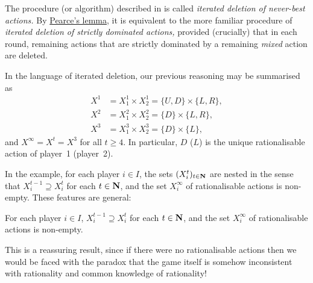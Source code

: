 The procedure (or algorithm) described in  is called \emph{iterated deletion of never-best actions.} By \hyperref[lemma:pearce]{Pearce's lemma}, it is equivalent to the more familiar procedure of \emph{iterated deletion of strictly dominated actions,} provided (crucially) that in each round, remaining actions that are strictly dominated by a remaining \emph{mixed} action are deleted.

\addtocounter{example}{-2}
\begin{example}[continued]
	\label{example:rbty_neverbest_rbty2}
	In the language of iterated deletion, our previous reasoning may be summarised as
	\begin{align*}
		X^1 &= X^1_1 \times X^1_2 = \{U,D\} \times \{L,R\} ,
		\\
		X^2 &= X^2_1 \times X^2_2 = \{D\} \times \{L,R\} ,
		\\
		X^3 &= X^3_1 \times X^3_2 = \{D\} \times \{L\} ,
	\end{align*}
	and $X^\infty = X^t = X^3$ for all $t \geq 4$. In particular, $D$ ($L$) is the unique rationalisable action of player~1 (player~2).
\end{example}
\addtocounter{example}{1}

In the example, for each player $i \in I$, the sets $(X^t_i)_{t \in \mathbf{N}}$ are nested in the sense that $X^{t-1}_i \supseteq X^t_i$ for each $t \in \mathbf{N}$, and the set $X^\infty_i$ of rationalisable actions is non-empty. These features are general:

\begin{proposition}
	\label{proposition:rbty_nonempty}
	For each player $i \in I$, $X^{t-1}_i \supseteq X^t_i$ for each $t \in \mathbf{N}$, and the set $X^\infty_i$ of rationalisable actions is non-empty.
\end{proposition}

This is a reassuring result, since if there were no rationalisable actions then we would be faced with the paradox that the game itself is somehow inconsistent with rationality and common knowledge of rationality!

